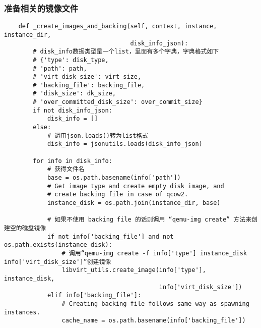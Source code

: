 \documentclass[a4paper,left=1.5cm,right=1.5cm,11pt]{article}
\begin{document}
\subsubsection{准备相关的镜像文件}

	\begin{lstlisting}
	def _create_images_and_backing(self, context, instance, instance_dir,
                                   disk_info_json):
        # disk_info数据类型是一个list，里面有多个字典，字典格式如下
		# {'type': disk_type,
		# 'path': path,
		# 'virt_disk_size': virt_size,
		# 'backing_file': backing_file,
		# 'disk_size': dk_size,
		# 'over_committed_disk_size': over_commit_size}
        if not disk_info_json:
            disk_info = []
        else:
			# 调用json.loads()转为list格式
            disk_info = jsonutils.loads(disk_info_json)

        for info in disk_info:
			# 获得文件名
            base = os.path.basename(info['path'])
            # Get image type and create empty disk image, and
            # create backing file in case of qcow2.
            instance_disk = os.path.join(instance_dir, base)

			# 如果不使用 backing file 的话则调用 “qemu-img create” 方法来创建空的磁盘镜像
            if not info['backing_file'] and not os.path.exists(instance_disk):
				# 调用“qemu-img create -f info['type'] instance_disk info['virt_disk_size']”创建镜像
                libvirt_utils.create_image(info['type'], instance_disk,
                                           info['virt_disk_size'])
            elif info['backing_file']:
                # Creating backing file follows same way as spawning instances.
                cache_name = os.path.basename(info['backing_file'])


\end{lstlisting}
\end{document}
